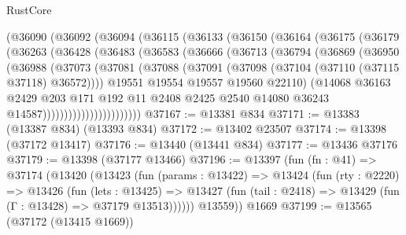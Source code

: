 \begin{lexlean}{RustCore}
\begin{coremodule}
      (@36090
        (@36092
          (@36094
            (@36115
              (@36133
                (@36150
                  (@36164
                    (@36175
                      (@36179
                        (@36263
                          (@36428
                            (@36483
                              (@36583
                                (@36666
                                  (@36713
                                    (@36794
                                      (@36869
                                        (@36950
                                          (@36988
                                            (@37073
                                              (@37081
                                                (@37088
                                                  (@37091
                                                    (@37098
                                                      (@37104 (@37110 (@37115 @37118) @36572))))
                                                  @19551
                                                  @19554
                                                  @19557
                                                  @19560
                                                  @22110)
                                                (@14068
                                                  @36163
                                                  @2429
                                                  @203
                                                  @171
                                                  @192
                                                  @11
                                                  @2408
                                                  @2425
                                                  @2540
                                                  @14080
                                                  @36243
                                                  @14587)))))))))))))))))))))))
@37167 := @13381 @834
@37171 := @13383 (@13387 @834) (@13393 @834)
@37172 := @13402 @23507
@37174 := @13398 (@37172 @13417)
@37176 := @13440 (@13441 @834)
@37177 := @13436 @37176
@37179 := @13398 (@37177 @13466)
@37196 := @13397
    (fun (fn : @41) =>
    @37174
      (@13420
        (@13423
          (fun (params : @13422) =>
          @13424
            (fun (rty : @2220) =>
            @13426
              (fun (lets : @13425) =>
              @13427 (fun (tail : @2418) => @13429 (fun (Γ : @13428) => @37179 @13513))))))
        @13559))
    @1669
@37199 := @13565 (@37172 (@13415 @1669))

\end{coremodule}
\end{lexlean}
